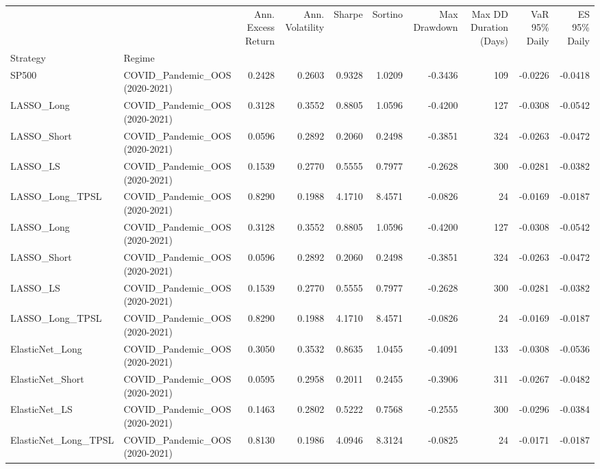 \begin{tabular}{llrrrrrrrr}
\toprule
 &  & Ann. Excess Return & Ann. Volatility & Sharpe & Sortino & Max Drawdown & Max DD Duration (Days) & VaR 95\% Daily & ES 95\% Daily \\
Strategy & Regime &  &  &  &  &  &  &  &  \\
\midrule
SP500 & COVID\_Pandemic\_OOS (2020-2021) & 0.2428 & 0.2603 & 0.9328 & 1.0209 & -0.3436 & 109 & -0.0226 & -0.0418 \\
\cline{1-10}
LASSO\_Long & COVID\_Pandemic\_OOS (2020-2021) & 0.3128 & 0.3552 & 0.8805 & 1.0596 & -0.4200 & 127 & -0.0308 & -0.0542 \\
\cline{1-10}
LASSO\_Short & COVID\_Pandemic\_OOS (2020-2021) & 0.0596 & 0.2892 & 0.2060 & 0.2498 & -0.3851 & 324 & -0.0263 & -0.0472 \\
\cline{1-10}
LASSO\_LS & COVID\_Pandemic\_OOS (2020-2021) & 0.1539 & 0.2770 & 0.5555 & 0.7977 & -0.2628 & 300 & -0.0281 & -0.0382 \\
\cline{1-10}
LASSO\_Long\_TPSL & COVID\_Pandemic\_OOS (2020-2021) & 0.8290 & 0.1988 & 4.1710 & 8.4571 & -0.0826 & 24 & -0.0169 & -0.0187 \\
\cline{1-10}
LASSO\_Long & COVID\_Pandemic\_OOS (2020-2021) & 0.3128 & 0.3552 & 0.8805 & 1.0596 & -0.4200 & 127 & -0.0308 & -0.0542 \\
\cline{1-10}
LASSO\_Short & COVID\_Pandemic\_OOS (2020-2021) & 0.0596 & 0.2892 & 0.2060 & 0.2498 & -0.3851 & 324 & -0.0263 & -0.0472 \\
\cline{1-10}
LASSO\_LS & COVID\_Pandemic\_OOS (2020-2021) & 0.1539 & 0.2770 & 0.5555 & 0.7977 & -0.2628 & 300 & -0.0281 & -0.0382 \\
\cline{1-10}
LASSO\_Long\_TPSL & COVID\_Pandemic\_OOS (2020-2021) & 0.8290 & 0.1988 & 4.1710 & 8.4571 & -0.0826 & 24 & -0.0169 & -0.0187 \\
\cline{1-10}
ElasticNet\_Long & COVID\_Pandemic\_OOS (2020-2021) & 0.3050 & 0.3532 & 0.8635 & 1.0455 & -0.4091 & 133 & -0.0308 & -0.0536 \\
\cline{1-10}
ElasticNet\_Short & COVID\_Pandemic\_OOS (2020-2021) & 0.0595 & 0.2958 & 0.2011 & 0.2455 & -0.3906 & 311 & -0.0267 & -0.0482 \\
\cline{1-10}
ElasticNet\_LS & COVID\_Pandemic\_OOS (2020-2021) & 0.1463 & 0.2802 & 0.5222 & 0.7568 & -0.2555 & 300 & -0.0296 & -0.0384 \\
\cline{1-10}
ElasticNet\_Long\_TPSL & COVID\_Pandemic\_OOS (2020-2021) & 0.8130 & 0.1986 & 4.0946 & 8.3124 & -0.0825 & 24 & -0.0171 & -0.0187 \\

\end{tabular}
